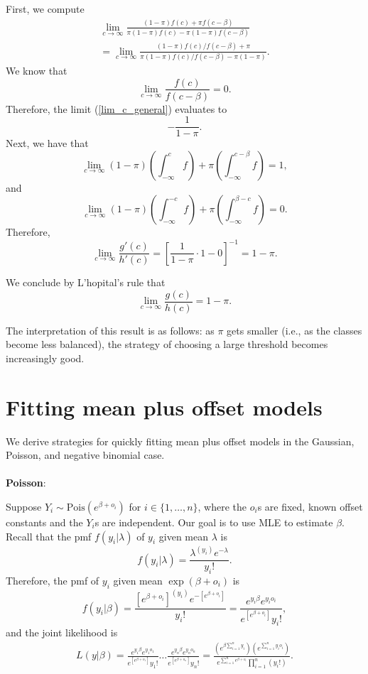 \documentclass[12pt]{article}
\begin{document}
First, we compute
\begin{multline}\label{lim_c_general}
\lim_{c \to \infty} \frac{ (1-\pi) f(c) + \pi f(c - \beta) }{ \pi (1-\pi) f(c) - \pi (1-\pi) f(c - \beta)} \\ = \lim_{c \to \infty} \frac{ (1-\pi) f(c)/f(c-\beta) + \pi }{ \pi(1-\pi) f(c)/f(c-\beta) - \pi(1-\pi)}.
\end{multline}
We know that $$ \lim_{c \to \infty} \frac{ f(c) }{f(c -\beta)} = 0.$$ Therefore, the limit (\ref{lim_c_general}) evaluates to
$$ -\frac{1}{1-\pi}.$$
Next, we have that
$$ \lim_{c \to \infty} (1-\pi) \left(\int_{-\infty}^c  f \right) + \pi \left( \int_{-\infty}^{c - \beta} f \right) = 1,$$ and
$$ \lim_{c \to \infty} \left(1 - \pi \right) \left( \int_{-\infty}^{-c} f \right) + \pi \left( \int_{-\infty}^{\beta-c} f \right) = 0.$$
Therefore,
$$ \lim_{c \to \infty} \frac{g'(c)}{h'(c)} = \left[ \frac{1}{1-\pi} \cdot 1 - 0\right]^{-1} = 1 - \pi.$$

We conclude by L'hopital's rule that
$$ \lim_{c \to \infty} \frac{g(c)}{h(c)} = 1 - \pi. $$

The interpretation of this result is as follows: as $\pi$ gets smaller (i.e., as the classes become less balanced), the strategy of choosing a large threshold becomes increasingly good.

\section{Fitting mean plus offset models}

We derive strategies for quickly fitting mean plus offset models in the Gaussian, Poisson, and negative binomial case.
\\ \\
\textbf{Poisson}:

Suppose $Y_i \sim \textrm{Pois}( e^{ \beta + o_i } )$ for $i \in \{1, \dots, n\}$, where the $o_i$s are fixed, known offset constants and the $Y_i$s are independent. Our goal is to use MLE to estimate $\beta$. Recall that the pmf $f(y_i | \lambda)$ of $y_i$ given mean $\lambda$ is
$$ f(y_i | \lambda) =  \frac{ \lambda^{(y_i)} e^{-\lambda} }{ y_i!}.$$ Therefore, the pmf of $y_i$ given mean $ \exp\left( \beta + o_i \right) $ is 
$$ f(y_i | \beta) = \frac{\left[ e^{\beta + o_i}  \right]^{(y_i)} e ^{ - \left[ e^{\beta + o_i}  \right] }}{ y_i! } = \frac{ e^{y_i\beta} e^{y_i o_i}   }{ e^{\left[ e^{\beta + o_i} \right]} y_i! },$$ and the joint likelihood is
\begin{multline*}
 L( y | \beta ) = \frac{ e^{ y_1 \beta } e^{ y_1 o_1}}{ e^{ \left[ e^{ \beta + o_1 } \right] } y_1! } \dots \frac{ e^{ y_n \beta } e^{ y_n o_n}}{ e^{ \left[ e^{ \beta + o_n } \right] } y_n! }  = \frac{ \left( e^{ \beta \sum_{i=1}^n y_i} \right) \left(e^{ \sum_{i=1}^n y_io_i} \right)}{ e^{ \sum_{i=1}^n e^{\beta + o_i}}  \prod_{i=1}^n \left( y_i! \right) }.
\end{multline*}
\end{document}
